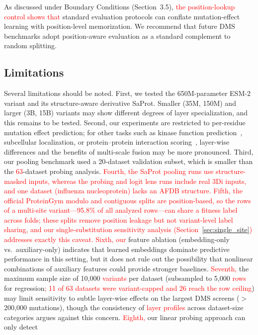 \documentclass[numbered,webpdf,modern,large]{oup-authoring-template}
\newcommand{\rev}[1]{\textcolor{red}{#1}}
\begin{document}
As discussed under Boundary Conditions (Section~3.5), \rev{the position-lookup
control shows that} standard evaluation protocols can conflate mutation-effect learning with
position-level memorization. We recommend that future DMS benchmarks adopt
position-aware evaluation as a standard complement to random splitting.

\subsection{Limitations}

Several limitations should be noted. First, we tested the 650M-parameter
ESM-2 variant and its structure-aware derivative SaProt. Smaller (35M, 150M)
and larger (3B, 15B) variants may show different degrees of layer specialization,
and this remains to be tested. Second, our
experiments are restricted to per-residue mutation effect prediction; for other
tasks such as kinase function prediction~\cite{kumar2025}, subcellular
localization, or protein--protein interaction scoring~\cite{elshaffei2025},
layer-wise differences and the benefits of multi-scale fusion may be more
pronounced. Third, our pooling benchmark used a 20-dataset validation subset,
which is smaller than the \rev{63}-dataset probing analysis. \rev{Fourth,
the SaProt pooling runs use structure-masked inputs, whereas the probing and logit
lens runs include real 3Di inputs, and one dataset (influenza nucleoprotein) lacks
an AFDB structure. Fifth, the official ProteinGym modulo and contiguous splits
are position-based, so the rows of a multi-site variant---95.8\% of all
analyzed rows---can share a fitness label across folds; these splits remove
position leakage but not variant-level label sharing, and our
single-substitution sensitivity analysis (Section~\ref{sec:single_site})
addresses exactly this caveat. Sixth, our}
feature ablation (embedding-only vs.\ auxiliary-only) indicates that learned embeddings
dominate predictive performance in this setting, but it does
not rule out the possibility that nonlinear combinations of auxiliary features
could provide stronger baselines.
\rev{Seventh,} the
maximum sample size of 10,000 \rev{variants} per dataset (subsampled to 5,000
\rev{rows} for regression\rev{; 11 of 63 datasets were variant-capped and 26
reach the row ceiling}) may limit sensitivity to
subtle layer-wise effects on the largest DMS screens ($>$200,000 mutations),
though the consistency of \rev{layer profiles} across dataset-size categories argues
against this concern. \rev{Eighth,} our linear probing approach can only detect
\end{document}
